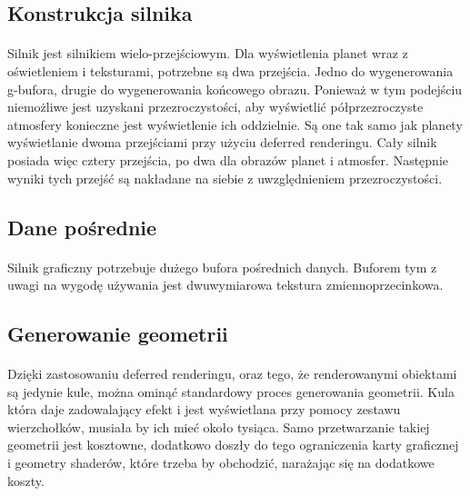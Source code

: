 
\subsection{Konstrukcja silnika}\label{sub:konstrukcja silnika}
\paragraph{}

Silnik jest silnikiem wielo-przejściowym. Dla wyświetlenia planet wraz z oświetleniem i teksturami, potrzebne są dwa przejścia. Jedno do wygenerowania g-bufora, drugie do wygenerowania końcowego obrazu. Ponieważ w tym podejściu niemożliwe jest uzyskani przezroczystości, aby wyświetlić półprzezroczyste atmosfery konieczne jest wyświetlenie ich oddzielnie. Są one tak samo jak planety wyświetlanie dwoma przejściami przy użyciu deferred renderingu. Cały silnik posiada więc cztery przejścia, po dwa dla obrazów planet i atmosfer. Następnie wyniki tych przejść są nakładane na siebie z uwzględnieniem przezroczystości.

\subsection{Dane pośrednie}\label{sub:dane pośrednie}
\paragraph{}

Silnik graficzny potrzebuje dużego bufora pośrednich danych. Buforem tym z uwagi na wygodę używania jest dwuwymiarowa tekstura zmiennoprzecinkowa. 

\subsection{Generowanie geometrii}\label{sub:generowanie geometrii}
\paragraph{}

Dzięki zastosowaniu deferred renderingu, oraz tego, że renderowanymi obiektami są jedynie kule, można ominąć standardowy proces generowania geometrii. Kula która daje zadowalający efekt i jest wyświetlana przy pomocy zestawu wierzchołków, musiała by ich mieć około tysiąca. Samo przetwarzanie takiej geometrii jest kosztowne, dodatkowo doszły do tego ograniczenia karty graficznej i geometry shaderów, które trzeba by obchodzić, narażając się na dodatkowe koszty.

